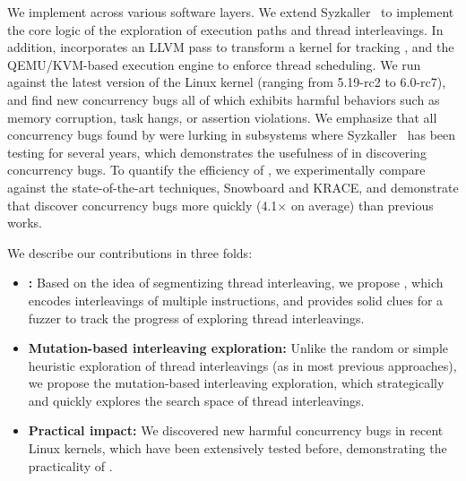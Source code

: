 

We implement \sys across various software layers.  We extend
Syzkaller~\cite{syzkaller} to implement the core logic of the
exploration of execution paths and thread interleavings.
%
In addition, \sys incorporates an LLVM pass to transform a kernel for
tracking \intcov, and the QEMU/KVM-based execution engine to enforce
thread scheduling.
%
We run \sys against the latest version of the Linux kernel (ranging
from 5.19-rc2 to 6.0-rc7), and find new \totalbugs concurrency bugs all of
which exhibits harmful behaviors such as memory corruption,
task hangs, or assertion violations. We emphasize that all
concurrency bugs found by \sys were lurking in subsystems where
Syzkaller~\cite{syzkaller} has been testing for several years, which
demonstrates the usefulness of \sys in discovering concurrency bugs.
%
To quantify the efficiency of \sys, we experimentally compare \sys 
against the state-of-the-art techniques, Snowboard and KRACE, and 
demonstrate that \sys discover concurrency bugs more quickly 
(4.1$\times$ on average) than previous works.

We describe our contributions in three folds:

\begin{itemize}
\item \textbf{\Intcov:}
  Based on the idea of segmentizing thread interleaving, we propose
  \intcov, which encodes interleavings of multiple instructions, and
  provides solid clues for a fuzzer to track the progress of
  exploring thread interleavings.
\item \textbf{Mutation-based interleaving exploration:}
  Unlike the random or simple heuristic exploration of thread
  interleavings (as in most previous approaches), we propose the
  mutation-based interleaving exploration, which strategically and
  quickly explores the search space of thread interleavings.
\item \textbf{Practical impact:}
  We discovered new \totalbugs harmful concurrency bugs in recent
  Linux kernels, which have been extensively tested before,
  demonstrating the practicality of \sys.
\end{itemize}

